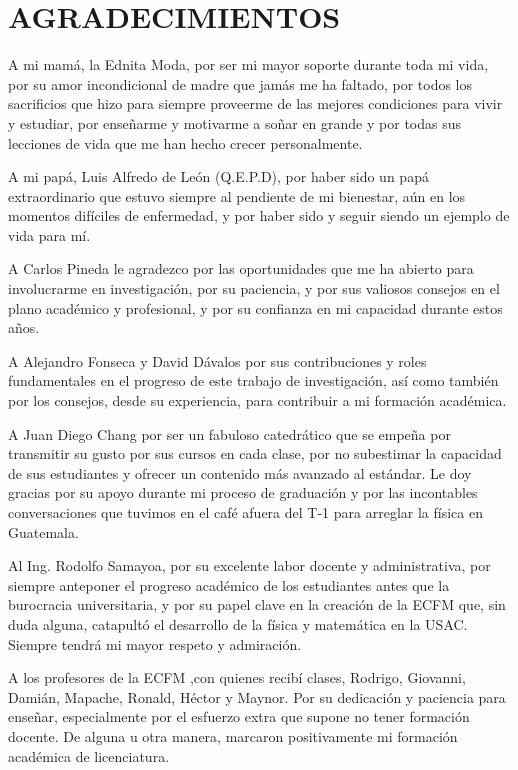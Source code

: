 \chapter*{AGRADECIMIENTOS}
\thispagestyle{empty}
A mi mamá, la Ednita Moda, por ser mi mayor soporte durante toda mi vida,
por su amor incondicional de madre que jamás me ha faltado,
por todos los sacrificios que hizo para siempre proveerme de 
las mejores condiciones para vivir y estudiar, por enseñarme y motivarme
a soñar en grande y por todas sus lecciones de vida que me han hecho
crecer personalmente.

A mi papá, Luis Alfredo de León (Q.E.P.D), por haber sido un papá extraordinario que 
estuvo siempre al pendiente de mi bienestar, aún en los momentos difíciles 
de enfermedad, y por haber sido y seguir siendo un ejemplo de vida para mí. 

A Carlos Pineda le agradezco por las oportunidades que me ha abierto para 
involucrarme en investigación, por su paciencia, y por sus valiosos consejos 
en el plano académico y profesional, y por su confianza en mi capacidad 
durante estos años.

A Alejandro Fonseca y David Dávalos por sus contribuciones y roles fundamentales
en el progreso de este trabajo de investigación, así como también por
los consejos, desde su experiencia, para contribuir a mi formación académica.

A Juan Diego Chang por ser un fabuloso catedrático que se empeña por transmitir
su gusto por sus cursos en cada clase, por no subestimar la capacidad de sus 
estudiantes y ofrecer un contenido más avanzado al estándar. 
Le doy gracias por su apoyo durante mi proceso de graduación
y por las incontables conversaciones que tuvimos en el café afuera del T-1
para arreglar la física en Guatemala.

Al Ing. Rodolfo Samayoa, por su excelente labor docente y administrativa, 
por siempre anteponer el progreso académico de los estudiantes antes que 
la burocracia universitaria, y por su papel clave en la creación de la ECFM
que, sin duda alguna, catapultó el desarrollo de la física y matemática en la USAC.
Siempre tendrá mi mayor respeto y admiración.

A los profesores de la ECFM ,con quienes recibí clases,
Rodrigo, Giovanni, Damián, Mapache, Ronald, Héctor y Maynor.
Por su dedicación y paciencia para enseñar, especialmente por 
el esfuerzo extra que supone no tener formación docente. 
De alguna u otra manera, marcaron positivamente mi formación 
académica de licenciatura. 

